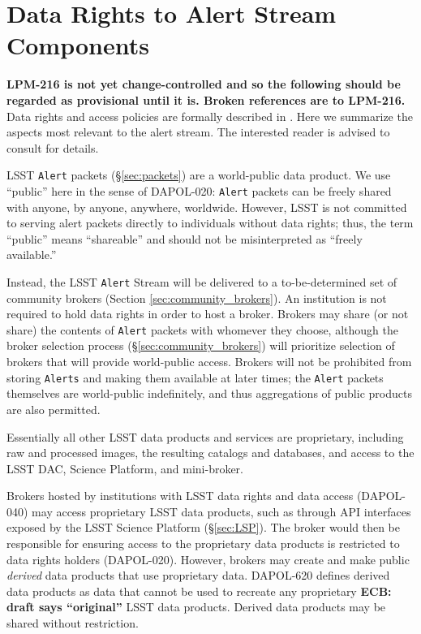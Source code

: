 \section{Data Rights to Alert Stream Components}\label{sec:data_rights}

\textbf{LPM-216 is not yet change-controlled and so the following should be regarded as provisional until it is.  Broken references are to LPM-216.}
Data rights and access policies are formally described in . 
Here we summarize the aspects most relevant to the alert stream.
The interested reader is advised to consult  for details.

LSST {\tt Alert} packets (\S \ref{sec:packets}) are a world-public data product.
We use ``public'' here in the sense of DAPOL-020:  \texttt{Alert} packets can be freely shared with anyone, by anyone, anywhere, worldwide.
However, LSST is not committed to serving alert packets directly to individuals without data rights;
thus, the term ``public'' means ``shareable'' and should not be misinterpreted as ``freely available.''

Instead, the LSST {\tt Alert} Stream will be delivered to a to-be-determined set of community brokers (Section \ref{sec:community_brokers}).
An institution is not required to hold data rights in order to host a broker.
Brokers may share (or not share) the contents of {\tt Alert} packets with whomever they choose, 
although the broker selection process (\S \ref{sec:community_brokers}) will prioritize selection of brokers that will provide world-public access.
Brokers will not be prohibited from storing {\tt Alerts} and making them available at later times;
the {\tt Alert} packets themselves are world-public indefinitely, and thus aggregations of public products are also permitted.

Essentially all other LSST data products and services are proprietary, including raw and processed images, the resulting catalogs and databases, and access to the LSST DAC, Science Platform, and mini-broker.

Brokers hosted by institutions with LSST data rights and data access (DAPOL-040) may access proprietary LSST data products, such as through API interfaces exposed by the LSST Science Platform (\S \ref{sec:LSP}).
The broker would then be responsible for ensuring access to the proprietary data products is restricted to data rights holders (DAPOL-020).
However, brokers may create and make public \textit{derived} data products that use proprietary data.
DAPOL-620 defines derived data products as data that cannot be used to recreate any proprietary \textbf{ECB: draft says ``original''} LSST data products.
Derived data products may be shared without restriction.

